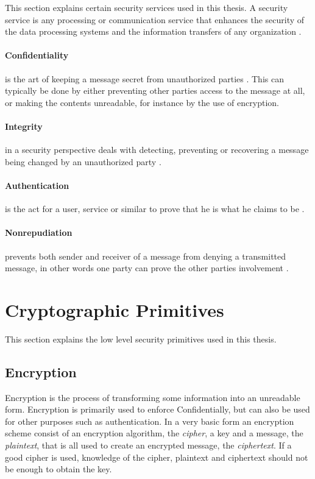 \documentclass[pdftex,english,10pt,b5paper,twoside]{book}
\begin{document}
This section explains certain security services used in this thesis. A security
service is any processing or communication service that enhances the security of
the data processing systems and the information transfers of any organization
\cite[p. 12]{stallings}.

\paragraph{Confidentiality} is the art of keeping a message secret from
unauthorized parties \cite[p. 18]{stallings}. This can typically be done by
either preventing other parties access to the message at all, or making the
contents unreadable, for instance by the use of encryption.

\paragraph{Integrity} in a security perspective deals with detecting,
preventing or recovering a message being changed by an unauthorized party
\cite{stallings}.

\paragraph{Authentication} is the act for a user, service or similar to prove
that he is what he claims to be \cite{stallings}.

\paragraph{Nonrepudiation} prevents both sender and receiver of a message
from denying a transmitted message, in other words one party can prove the
other parties involvement \cite{stallings}.

\section{Cryptographic Primitives}

This section explains the low level security primitives used in this thesis.

\subsection{Encryption}

Encryption is the process of transforming some
information into an unreadable form. Encryption is primarily used to enforce
Confidentially, but can also be used for other purposes such as authentication.
In a very basic form an encryption scheme consist of an encryption algorithm,
the \emph{cipher}, a key and a message, the \emph{plaintext}, that is all used
to create an encrypted message, the \emph{ciphertext}. If a good cipher is
used, knowledge of the cipher, plaintext and ciphertext should not be enough to
obtain the key.
\end{document}
